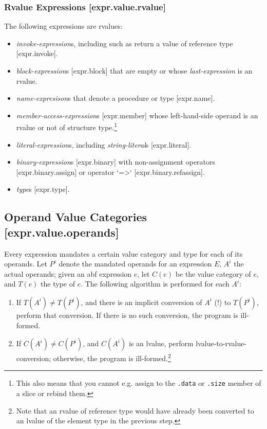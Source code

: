 \documentclass[a4paper, 12pt, oneside, final]{article}
\def\sref[#1]{[#1]}
\begin{document}
\subsubsection{Rvalue Expressions [expr.value.rvalue]}
The following expressions are rvalues:
\begin{itemize}
\item \emph{invoke-expression}s, including such as return a value of reference type \sref[expr.invoke].
\item \emph{block-expression}s \sref[expr.block] that are empty or whose \emph{last-expression} is an rvalue.
\item \emph{name-expresison}s that denote a procedure or type \sref[expr.name].
\item \emph{member-access-expression}s \sref[expr.member] whose left-hand-side operand is an rvalue or not of structure type.\footnote{This
      also means that you cannot e.g. assign to the \texttt{.data} or \texttt{.size} member of a slice or rebind them.}
\item \emph{literal-expression}s, including \emph{string-literal}s \sref[expr.literal].
\item \emph{binary-expression}s \sref[expr.binary] with non-assignment operators \sref[expr.binary.assign] or operator `=>` \sref[expr.binary.refassign].
\item \emph{type}s \sref[expr.type].
\end{itemize}

\subsection{Operand Value Categories [expr.value.operands]}
Every expression mandates a certain value category and type for each of its operands. Let $P^i$ denote the mandated
operands for an expression $E$, $A^i$ the actual operands; given an abf expression $e$, let $C(e)$ be the value category of $e$, and $T(e)$ the type
of $e$. The following algorithm is performed for each $A^i$:
\begin{enumerate}
\item If $T(A^i) \neq T(P^i)$, and there is an implicit conversion of $A^i$ (!) to $T(P^i)$, perform that conversion.
      If there is no such conversion, the program is ill-formed.
\item If $C(A^i) \neq C(P^i)$, and $C(A^i)$ is an lvalue, perform lvalue-to-rvalue-conversion; otherwise, the program
      is ill-formed.\footnote{Note that an rvalue of reference type would have already been converted to an lvalue of
      the element type in the previous step.}
\end{enumerate}
\end{document}
